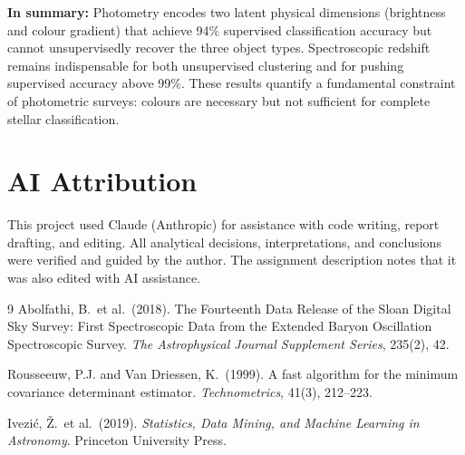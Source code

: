 \documentclass[12pt]{article}
\begin{document}
\textbf{In summary:} Photometry encodes two latent physical dimensions (brightness and colour
gradient) that achieve 94\% supervised classification accuracy but cannot unsupervisedly
recover the three object types. Spectroscopic redshift remains indispensable for both
unsupervised clustering and for pushing supervised accuracy above 99\%. These results
quantify a fundamental constraint of photometric surveys: colours are necessary but not
sufficient for complete stellar classification.

\section*{AI Attribution}

This project used Claude (Anthropic) for assistance with code writing, report drafting, and
editing. All analytical decisions, interpretations, and conclusions were verified and guided
by the author. The assignment description notes that it was also edited with AI assistance.


\begin{thebibliography}{9}
Abolfathi, B.\ et al.\ (2018).
\newblock The Fourteenth Data Release of the Sloan Digital Sky Survey: First
  Spectroscopic Data from the Extended Baryon Oscillation Spectroscopic Survey.
\newblock \emph{The Astrophysical Journal Supplement Series}, 235(2), 42.

Rousseeuw, P.J. and Van Driessen, K.\ (1999).
\newblock A fast algorithm for the minimum covariance determinant estimator.
\newblock \emph{Technometrics}, 41(3), 212--223.

Ivezi\'{c}, \v{Z}.\ et al.\ (2019).
\newblock \emph{Statistics, Data Mining, and Machine Learning in Astronomy}.
\newblock Princeton University Press.
\end{thebibliography}
\end{document}
